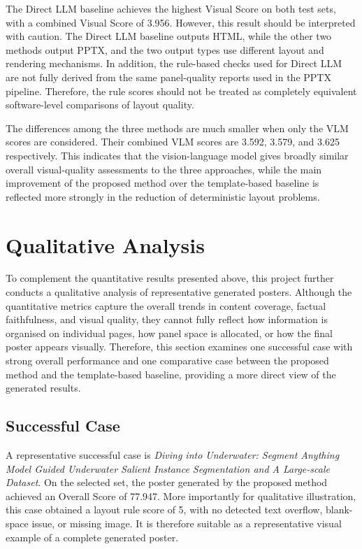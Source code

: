 \documentclass[12pt,oneside]{report}
\begin{document}
\vspace{1em}

The Direct LLM baseline achieves the highest Visual Score on both test sets, with a combined Visual Score of 3.956. However, this result should be interpreted with caution. The Direct LLM baseline outputs HTML, while the other two methods output PPTX, and the two output types use different layout and rendering mechanisms. In addition, the rule-based checks used for Direct LLM are not fully derived from the same panel-quality reports used in the PPTX pipeline. Therefore, the rule scores should not be treated as completely equivalent software-level comparisons of layout quality.

\vspace{1em}

The differences among the three methods are much smaller when only the VLM scores are considered. Their combined VLM scores are 3.592, 3.579, and 3.625 respectively. This indicates that the vision-language model gives broadly similar overall visual-quality assessments to the three approaches, while the main improvement of the proposed method over the template-based baseline is reflected more strongly in the reduction of deterministic layout problems.

\section{Qualitative Analysis}

To complement the quantitative results presented above, this project further conducts a qualitative analysis of representative generated posters. Although the quantitative metrics capture the overall trends in content coverage, factual faithfulness, and visual quality, they cannot fully reflect how information is organised on individual pages, how panel space is allocated, or how the final poster appears visually. Therefore, this section examines one successful case with strong overall performance and one comparative case between the proposed method and the template-based baseline, providing a more direct view of the generated results.

\subsection{Successful Case}

A representative successful case is \textit{Diving into Underwater: Segment Anything Model Guided Underwater Salient Instance Segmentation and A Large-scale Dataset}. On the selected set, the poster generated by the proposed method achieved an Overall Score of 77.947. More importantly for qualitative illustration, this case obtained a layout rule score of 5, with no detected text overflow, blank-space issue, or missing image. It is therefore suitable as a representative visual example of a complete generated poster.
\end{document}
